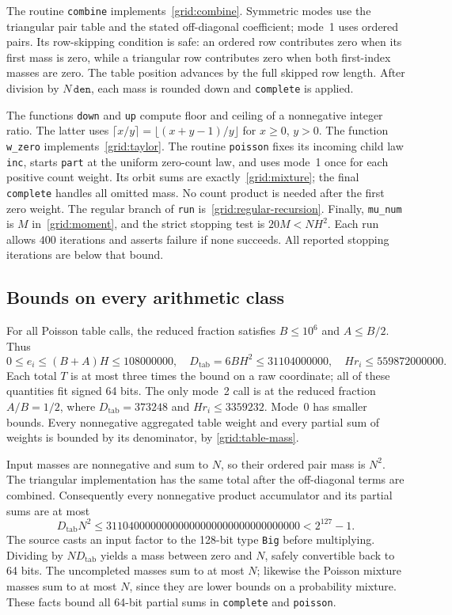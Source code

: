 The routine \texttt{combine} implements~\eqref{grid:combine}.  Symmetric
modes use the triangular pair table and the stated off-diagonal
coefficient; mode~1 uses ordered pairs.  Its row-skipping condition is
safe: an ordered row contributes zero when its first mass is zero,
while a triangular row contributes zero when both first-index masses
are zero.  The table position advances by the full skipped row length.
After division by $N\,\mathtt{den}$, each mass is rounded down and
\texttt{complete} is applied.

The functions \texttt{down} and \texttt{up} compute floor and ceiling
of a nonnegative integer ratio.  The latter uses
$\lceil x/y\rceil=\lfloor(x+y-1)/y\rfloor$ for $x\geq0$, $y>0$.
The function \texttt{w\_zero} implements~\eqref{grid:taylor}.
The routine \texttt{poisson} fixes its incoming child law
\texttt{inc}, starts \texttt{part} at the uniform zero-count law, and
uses mode~1 once for each positive count weight.  Its orbit sums are
exactly~\eqref{grid:mixture}; the final \texttt{complete} handles all
omitted mass.  No count product is needed after the first zero weight.
The regular branch of \texttt{run} is~\eqref{grid:regular-recursion}.
Finally, \texttt{mu\_num} is $M$ in~\eqref{grid:moment}, and the strict
stopping test is $20M<NH^2$.  Each run allows $400$ iterations and
asserts failure if none succeeds.  All reported stopping iterations
are below that bound.

\subsection{Bounds on every arithmetic class}

For all Poisson table calls, the reduced fraction satisfies
$B\leq10^6$ and $A\leq B/2$.  Thus
\[
 0\leq e_i\leq(B+A)H\leq108000000,
 \quad D_{\mathrm{tab}}=6BH^2\leq31104000000,
 \quad Hr_i\leq559872000000.
\]
Each total $T$ is at most three times the bound on a raw coordinate;
all of these quantities fit signed 64 bits.  The only mode~2 call is
at the reduced fraction $A/B=1/2$, where
$D_{\mathrm{tab}}=373248$ and $Hr_i\leq3359232$.
Mode~0 has smaller bounds.  Every nonnegative aggregated table weight
and every partial sum of weights is bounded by its denominator, by
\eqref{grid:table-mass}.

Input masses are nonnegative and sum to $N$, so their ordered pair
mass is $N^2$.  The triangular implementation has the same total
after the off-diagonal terms are combined.  Consequently every
nonnegative product accumulator and its partial sums are at most
\[
 D_{\mathrm{tab}}N^2
 \leq31104000000000000000000000000000000<2^{127}-1.
\]
The source casts an input factor to the 128-bit type \texttt{Big}
before multiplying.  Dividing by $ND_{\mathrm{tab}}$ yields a mass
between zero and $N$, safely convertible back to 64 bits.  The
uncompleted masses sum to at most $N$; likewise the Poisson mixture
masses sum to at most $N$, since they are lower bounds on a probability
mixture.  These facts bound all 64-bit partial sums in
\texttt{complete} and \texttt{poisson}.

